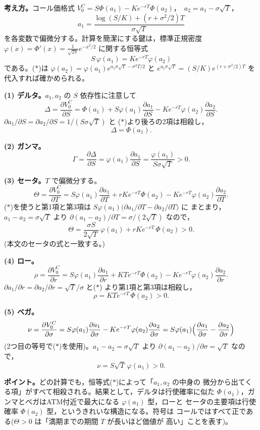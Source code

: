 \begin{answerbox}
\textbf{考え方。}コール価格式
$V_0^C = S\Phi(a_1) - Ke^{-rT}\Phi(a_2)$，\ $a_2 = a_1 - \sigma\sqrt{T}$，
\[
a_1 = \frac{\log(S/K) + (r+\sigma^2/2)T}{\sigma\sqrt{T}}
\]
を各変数で偏微分する。計算を簡潔にする鍵は，標準正規密度
$\varphi(x) = \Phi'(x) = \frac{1}{\sqrt{2\pi}}e^{-x^2/2}$ に関する恒等式
\begin{equation}
S\,\varphi(a_1) = Ke^{-rT}\varphi(a_2)
\tag{$\ast$}
\end{equation}
である。($\ast$)は
$\varphi(a_2) = \varphi(a_1)e^{a_1\sigma\sqrt{T} - \sigma^2T/2}$ と
$e^{a_1\sigma\sqrt{T}} = (S/K)e^{(r+\sigma^2/2)T}$ を代入すれば確かめられる。

\medskip
\textbf{(1) デルタ。}$a_1, a_2$ の $S$ 依存性に注意して
\[
\Delta = \frac{\partial V_0^C}{\partial S}
= \Phi(a_1) + S\varphi(a_1)\frac{\partial a_1}{\partial S}
- Ke^{-rT}\varphi(a_2)\frac{\partial a_2}{\partial S}.
\]
$\partial a_1/\partial S = \partial a_2/\partial S = 1/(S\sigma\sqrt{T})$ と
($\ast$)より後ろの2項は相殺し，
\[
\boxed{\Delta = \Phi(a_1)}.
\]

\textbf{(2) ガンマ。}
\[
\Gamma = \frac{\partial\Delta}{\partial S}
= \varphi(a_1)\frac{\partial a_1}{\partial S}
= \boxed{\frac{\varphi(a_1)}{S\sigma\sqrt{T}}} > 0.
\]

\textbf{(3) セータ。}$T$ で偏微分する。
\[
\Theta = \frac{\partial V_0^C}{\partial T}
= S\varphi(a_1)\frac{\partial a_1}{\partial T}
+ rKe^{-rT}\Phi(a_2) - Ke^{-rT}\varphi(a_2)\frac{\partial a_2}{\partial T}.
\]
($\ast$)を使うと第1項と第3項は
$S\varphi(a_1)\bigl(\partial a_1/\partial T - \partial a_2/\partial T\bigr)$ に
まとまり，$a_1 - a_2 = \sigma\sqrt{T}$ より
$\partial(a_1-a_2)/\partial T = \sigma/(2\sqrt{T})$ なので，
\[
\boxed{\Theta = \frac{\sigma S}{2\sqrt{T}}\,\varphi(a_1)
+ rKe^{-rT}\,\Phi(a_2)} > 0.
\]
(本文のセータの式と一致する。)

\textbf{(4) ロー。}
\[
\rho = \frac{\partial V_0^C}{\partial r}
= S\varphi(a_1)\frac{\partial a_1}{\partial r}
+ KTe^{-rT}\Phi(a_2) - Ke^{-rT}\varphi(a_2)\frac{\partial a_2}{\partial r}.
\]
$\partial a_1/\partial r = \partial a_2/\partial r = \sqrt{T}/\sigma$ と($\ast$)
より第1項と第3項は相殺し，
\[
\boxed{\rho = KTe^{-rT}\,\Phi(a_2)} > 0.
\]

\textbf{(5) ベガ。}
\[
\nu = \frac{\partial V_0^C}{\partial\sigma}
= S\varphi(a_1)\frac{\partial a_1}{\partial\sigma}
- Ke^{-rT}\varphi(a_2)\frac{\partial a_2}{\partial\sigma}
= S\varphi(a_1)\Bigl(\frac{\partial a_1}{\partial\sigma}
- \frac{\partial a_2}{\partial\sigma}\Bigr)
\]
(2つ目の等号で($\ast$)を使用)。$a_1 - a_2 = \sigma\sqrt{T}$ より
$\partial(a_1-a_2)/\partial\sigma = \sqrt{T}$ なので，
\[
\boxed{\nu = S\sqrt{T}\,\varphi(a_1)} > 0.
\]

\medskip
\textbf{ポイント。}どの計算でも，恒等式($\ast$)によって「$a_1,a_2$ の中身の
微分から出てくる項」がすべて相殺される。結果として，デルタは行使確率に似た
$\Phi(a_1)$，ガンマとベガはATM付近で最大になる $\varphi(a_1)$ 型，ローと
セータの主要項は行使確率 $\Phi(a_2)$ 型，というきれいな構造になる。符号は
コールではすべて正である($\Theta>0$ は「満期までの期間 $T$ が長いほど価値が
高い」ことを表す)。
\end{answerbox}


